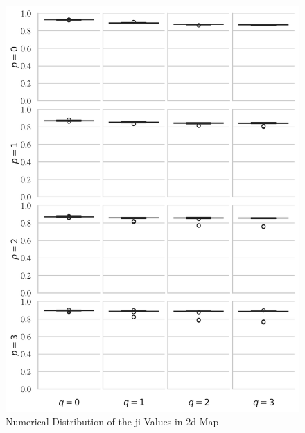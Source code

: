 \begin{figure}[htbp!]
\centering
\includegraphics{images/ji2D.png}
\caption{Numerical Distribution of the \gls{ji} Values in \gls{2d} Map}
\label{fig:ji2D}
\end{figure}

